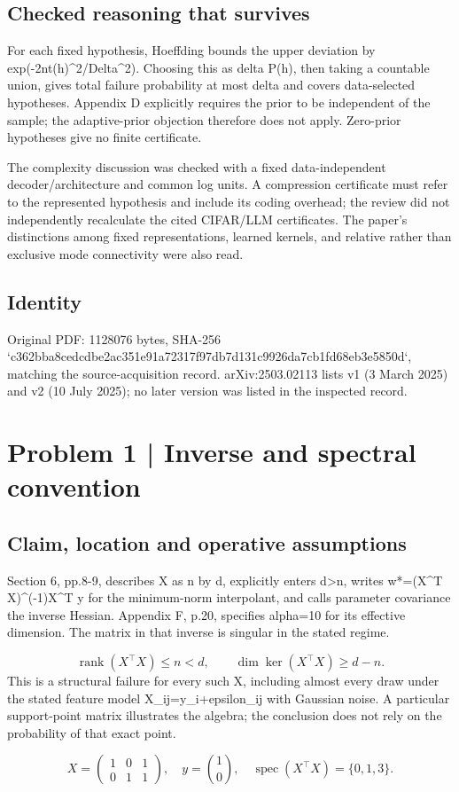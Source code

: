 \documentclass[10pt]{article}
\begin{document}
\subsection*{Checked reasoning that survives}
For each fixed hypothesis, Hoeffding bounds the upper deviation by exp(-2nt(h)\textasciicircum{}2/Delta\textasciicircum{}2). Choosing this as delta P(h), then taking a countable union, gives total failure probability at most delta and covers data-selected hypotheses. Appendix D explicitly requires the prior to be independent of the sample; the adaptive-prior objection therefore does not apply. Zero-prior hypotheses give no finite certificate.\par
The complexity discussion was checked with a fixed data-independent decoder/architecture and common log units. A compression certificate must refer to the represented hypothesis and include its coding overhead; the review did not independently recalculate the cited CIFAR/LLM certificates. The paper’s distinctions among fixed representations, learned kernels, and relative rather than exclusive mode connectivity were also read.\par
\subsection*{Identity}
Original PDF: 1128076 bytes, SHA-256 `c362bba8cedcdbe2ac351e91a72317f97db7d131c9926da7cb1fd68eb3e5850d`, matching the source-acquisition record. arXiv:2503.02113 lists v1 (3 March 2025) and v2 (10 July 2025); no later version was listed in the inspected record.\par
\section*{Problem 1 | Inverse and spectral convention}
\subsection*{Claim, location and operative assumptions}
Section 6, pp.8-9, describes X as n by d, explicitly enters d>n, writes w*=(X\textasciicircum{}T X)\textasciicircum{}(-1)X\textasciicircum{}T y for the minimum-norm interpolant, and calls parameter covariance the inverse Hessian. Appendix F, p.20, specifies alpha=10 for its effective dimension. The matrix in that inverse is singular in the stated regime.\par
\[\operatorname{rank}(X^\top X)\le n<d,\qquad \dim\ker(X^\top X)\ge d-n.\] This is a structural failure for every such X, including almost every draw under the stated feature model X\_ij=y\_i+epsilon\_ij with Gaussian noise. A particular support-point matrix illustrates the algebra; the conclusion does not rely on the probability of that exact point.\par
\[X=\begin{pmatrix}1&0&1\\0&1&1\end{pmatrix},\quad y=\binom10,\quad \operatorname{spec}(X^\top X)=\{0,1,3\}.\]\par
\end{document}
